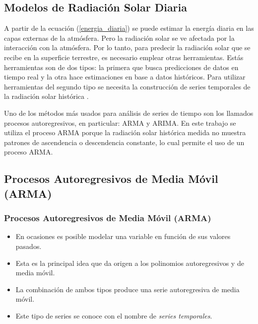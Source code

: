 \documentclass{beamer}
\begin{document}
\subsection{Modelos de Radiación Solar Diaria}
\begin{frame}
   \scriptsize
   A partir de la ecuación (\ref{energia_diaria}) se puede estimar la energía diaria en las capas externas de la atmósfera. Pero la radiación solar
   se ve afectada por la interacción con la atmósfera. Por lo tanto, para predecir la radiación solar que se recibe en la superficie terrestre, es necesario
   emplear otras herramientas. Estás herramientas son de dos tipos: la primera que busca predicciones de datos en tiempo real y la otra hace estimaciones
   en base a datos históricos. Para utilizar herramientas del segundo tipo se necesita la construcción de series temporales de la radiación solar histórica \cite{predicc_solar}. \par

   Uno de los métodos más usados para análisis de series de tiempo son los llamados procesos autoregresivos, en particular: ARMA y ARIMA. En este trabajo se utiliza el proceso ARMA porque la radiación solar histórica 
   medida no muestra patrones de ascendencia o descendencia constante, lo cual permite el uso de un proceso ARMA.  
\end{frame}

\subsection{Procesos Autoregresivos de Media Móvil (ARMA)}
\begin{frame}
   \frametitle{Procesos Autoregresivos de Media Móvil (ARMA)}
   \scriptsize
   \begin{itemize}
      \item En ocasiones es posible modelar una variable en función de sus valores pasados. 
      \vspace{1cm}
      \item Esta es la principal idea que da origen a los polinomios autoregresivos y de media móvil.
      \vspace{1cm}
      \item La combinación de ambos tipos produce una serie autoregresiva de media móvil.
      \vspace{1cm}
      \item Este tipo de series se conoce con el nombre de \textit{series temporales}.
   \end{itemize}
\end{frame}
\end{document}
